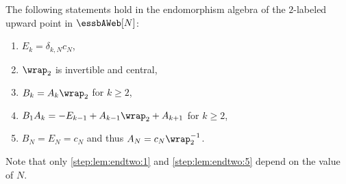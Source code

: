 \begin{lemma}\label{lem:endtwo} The following statements hold in the endomorphism algebra of the $2$-labeled upward point in $\essbAWeb[N]$:
\begin{enumerate}
\item $E_k = \delta_{k,N} c_N$, \label{step:lem:endtwo:1}
\item $\wrap_2$ is invertible and central, \label{step:lem:endtwo:2}
\item $B_k= A_k \wrap_2$ for $k\geq 2$, \label{step:lem:endtwo:3}
\item $B_1 A_k = - E_{k-1} + A_{k-1} \wrap_2 + A_{k+1}$ for $k\geq 2$, \label{step:lem:endtwo:4}
\item $B_N=E_N=c_N$ and thus $A_{N}=c_N \wrap_2^{-1}$. \label{step:lem:endtwo:5}
\end{enumerate}
\end{lemma}
Note that only \eqref{step:lem:endtwo:1} and \eqref{step:lem:endtwo:5} depend on the value of $N$.
